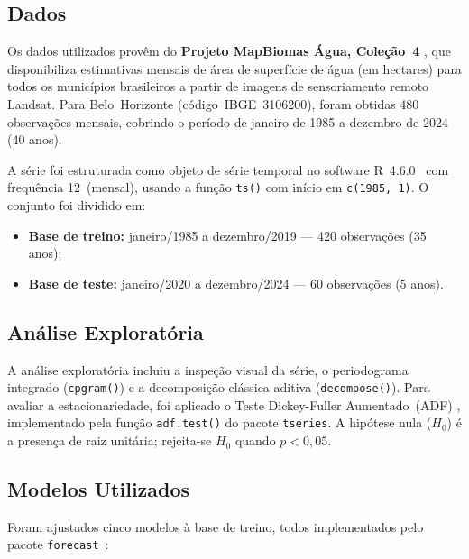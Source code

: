 \documentclass[12pt, a4paper]{article}
\begin{document}
\subsection{Dados}

Os dados utilizados provêm do \textbf{Projeto MapBiomas Água, Coleção~4}
\cite{mapbiomas2024}, que disponibiliza estimativas mensais de área de
superfície de água (em hectares) para todos os municípios brasileiros a partir
de imagens de sensoriamento remoto Landsat. Para Belo~Horizonte
(código~IBGE~3106200), foram obtidas 480 observações mensais, cobrindo o
período de janeiro de 1985 a dezembro de 2024 (40 anos).

A série foi estruturada como objeto de série temporal no software
R~4.6.0~\cite{rcore2025} com frequência 12~(mensal), usando a função
\texttt{ts()} com início em \texttt{c(1985, 1)}. O conjunto foi dividido em:

\begin{itemize}[nosep]
  \item \textbf{Base de treino:} janeiro/1985 a dezembro/2019 ---
        420 observações (35 anos);
  \item \textbf{Base de teste:} janeiro/2020 a dezembro/2024 ---
        60 observações (5 anos).
\end{itemize}

\subsection{Análise Exploratória}

A análise exploratória incluiu a inspeção visual da série, o periodograma
integrado (\texttt{cpgram()}) e a decomposição clássica aditiva
(\texttt{decompose()}). Para avaliar a estacionariedade, foi aplicado o Teste
Dickey-Fuller Aumentado~(ADF) \cite{dickeyfuller1979}, implementado pela função
\texttt{adf.test()} do pacote \texttt{tseries}. A hipótese nula ($H_0$) é a
presença de raiz unitária; rejeita-se $H_0$ quando $p < 0{,}05$.

\subsection{Modelos Utilizados}

Foram ajustados cinco modelos à base de treino, todos implementados pelo pacote
\texttt{forecast}~\cite{hyndman2008}:
\end{document}
